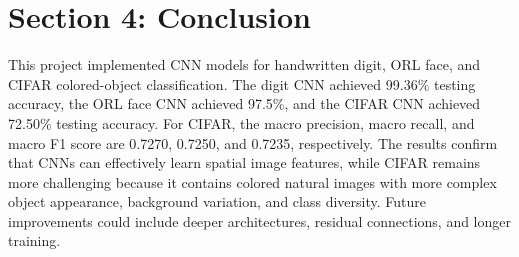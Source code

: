 \documentclass[10pt]{article}
\begin{document}
\section*{Section 4: Conclusion}

This project implemented CNN models for handwritten digit, ORL face, and CIFAR colored-object classification. The digit CNN achieved 99.36\% testing accuracy, the ORL face CNN achieved 97.5\%, and the CIFAR CNN achieved 72.50\% testing accuracy. For CIFAR, the macro precision, macro recall, and macro F1 score are 0.7270, 0.7250, and 0.7235, respectively. The results confirm that CNNs can effectively learn spatial image features, while CIFAR remains more challenging because it contains colored natural images with more complex object appearance, background variation, and class diversity. Future improvements could include deeper architectures, residual connections, and longer training.
\end{document}
